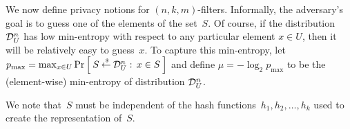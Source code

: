 


 We now define privacy notions for $(n,k,m)$-filters.  Informally, the adversary's goal is to guess one of the elements of the set~$S$.  Of course, if the distribution~$\mathcal{D}_{U}^{n}$ has low min-entropy with respect to any particular element $x \in U$, then it will be relatively easy to guess~$x$.  To capture this min-entropy, let $p_{\mathrm{max}} = \max_{x \in U} \Pr\left[\: S {\:\stackrel{{\scriptscriptstyle \hspace{0.2em}\$}} {\leftarrow}\:} \mathcal{D}_{U}^{n}:\, x \in S \:\right]$ and define $\mu = -\log_2 p_{\mathrm{max}}$ to be the (element-wise) min-entropy of distribution $\mathcal{D}_{U}^{n}$.

We note that~$S$ must be independent of the hash functions~$h_1,h_2,\ldots,h_k$ used to create the representation of~$S$.  


